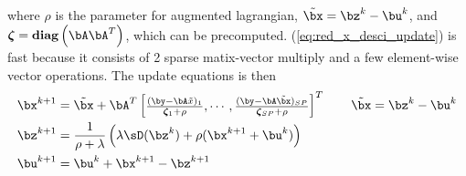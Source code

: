 \documentclass[11pt]{article}
\renewcommand{\diag}{\mathbf{diag}}
\newcommand\bzeta{\ensuremath{\boldsymbol{\zeta}}}
\begin{document}
where $\rho$ is the parameter for augmented lagrangian, $\tilde{\bx} = \bz^k - \bu^k$, and $\bzeta = \diag \left(\bA\bA^T\right)$, which can be precomputed. (\ref{eq:red_x_desci_update}) is fast because it consists of 2 sparse matix-vector multiply and a few element-wise vector operations. The update equations is then
\begin{align} 
    \bx^{k+1}
        &= \tilde{\bx} + \bA^T \begin{bmatrix}
            \frac{(\by - \bA\tilde{x})_1}{\bzeta_1 + \rho},\cdots, \frac{(\by - \bA\tilde{\bx})_{SP}}{\bzeta_{SP} + \rho}
        \end{bmatrix}^T
        \qquad \tilde{\bx} = \bz^k - \bu^k \\
    \bz^{k+1}
        &= \frac{1}{\rho + \lambda} \left(
            \lambda \sD(\bz^{k}) + \rho ( \bx^{k+1} + \bu^k  )
        \right) \\
    \bu^{k+1}
        &= \bu^k + \bx^{k+1} - \bz^{k+1}
    \label{eq:red_admm_update_equations_fast_x_update}
\end{align}


\end{document}
